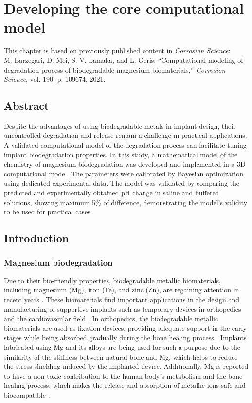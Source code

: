 \chapter{Developing the core computational model}\label{ch:core}

\begin{shaded}
This chapter is based on previously published content in \textit{Corrosion Science}:\\
M. Barzegari, D. Mei, S. V. Lamaka, and L. Geris, ``Computational modeling of degradation process of biodegradable magnesium biomaterials,'' \textit{Corrosion Science}, vol. 190, p. 109674, 2021.
\end{shaded}

\section*{Abstract}
Despite the advantages of using biodegradable metals in implant design, their uncontrolled degradation and release remain a challenge in practical applications. A validated computational model of the degradation process can facilitate tuning implant biodegradation properties. In this study, a mathematical model of the chemistry of magnesium biodegradation was developed and implemented in a 3D computational model. The parameters were calibrated by Bayesian optimization using dedicated experimental data. The model was validated by comparing the predicted and experimentally obtained pH change in saline and buffered solutions, showing maximum 5\% of difference, demonstrating the model's validity to be used for practical cases.


\section{Introduction}

\subsection{Magnesium biodegradation}

Due to their bio-friendly properties, biodegradable metallic biomaterials, including magnesium (Mg), iron (Fe), and zinc (Zn), are regaining attention in recent years \cite{Zheng2014}. These biomaterials find important applications in the design and manufacturing of supportive implants such as temporary devices in orthopedics and the cardiovascular field  \cite{Chen2014,Zhao2017}. In orthopedics, the biodegradable metallic biomaterials are used as fixation devices, providing adequate support in the early stages while being absorbed gradually during the bone healing process \cite{Qin2019}. Implants fabricated using Mg and its alloys are being used for such a purpose \cite{Riaz2018} due to the similarity of the stiffness between natural bone and Mg, which helps to reduce the stress shielding induced by the implanted device. Additionally, Mg is reported to have a non-toxic contribution to the human body's metabolism and the bone healing process, which makes the release and absorption of metallic ions safe and biocompatible \cite{Xin2008}.


